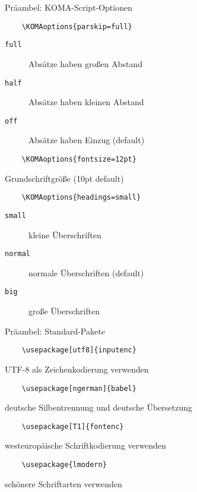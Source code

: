 \begin{frame}[fragile]{Präambel: KOMA-Script-Optionen}

  \begin{lstlisting}
    \KOMAoptions{parskip=full}
  \end{lstlisting}
  \begin{description}
    \item[\texttt{full}] Absätze haben großen Abstand
    \item[\texttt{half}] Absätze haben kleinen Abstand
    \item[\texttt{off}] Absätze haben Einzug (default)
  \end{description}

  \begin{lstlisting}
    \KOMAoptions{fontsize=12pt}
  \end{lstlisting}
  Grundschriftgröße (10pt default)

  \begin{lstlisting}
    \KOMAoptions{headings=small}
  \end{lstlisting}
  \begin{description}
    \item[\texttt{small}] kleine Überschriften
    \item[\texttt{normal}] normale Überschriften (default)
    \item[\texttt{big}] große Überschriften
  \end{description}
\end{frame}

\begin{frame}[fragile]{Präambel: Standard-Pakete}
  
  \begin{lstlisting}
    \usepackage[utf8]{inputenc}
  \end{lstlisting}
  UTF-8 als Zeichenkodierung verwenden
  
  \begin{lstlisting}
    \usepackage[ngerman]{babel}
  \end{lstlisting}
  deutsche Silbentrennung und deutsche Übersetzung
  
  \begin{lstlisting}
    \usepackage[T1]{fontenc}
  \end{lstlisting}
  westeuropäische Schriftkodierung verwenden
  
  \begin{lstlisting}
    \usepackage{lmodern}
  \end{lstlisting}
  schönere Schriftarten verwenden
\end{frame}

